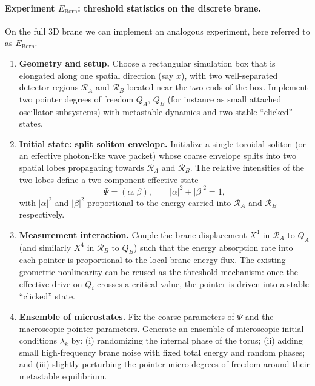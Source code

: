 \paragraph{Experiment $E_{\mathrm{Born}}$: threshold statistics on the discrete brane.}

On the full 3D brane we can implement an analogous experiment, here referred to as $E_{\mathrm{Born}}$.

\begin{enumerate}
  \item \textbf{Geometry and setup.}
    Choose a rectangular simulation box that is elongated along one spatial direction (say $x$), with two well-separated detector regions $\mathcal{R}_A$ and $\mathcal{R}_B$ located near the two ends of the box.
    Implement two pointer degrees of freedom $Q_A$, $Q_B$ (for instance as small attached oscillator subsystems) with metastable dynamics and two stable ``clicked'' states.
  \item \textbf{Initial state: split soliton envelope.}
    Initialize a single toroidal soliton (or an effective photon-like wave packet) whose coarse envelope splits into two spatial lobes propagating towards $\mathcal{R}_A$ and $\mathcal{R}_B$.
    The relative intensities of the two lobes define a two-component effective state
    \begin{equation}
      \Psi = (\alpha,\beta),
      \qquad
      |\alpha|^2 + |\beta|^2 = 1,
    \end{equation}
    with $|\alpha|^2$ and $|\beta|^2$ proportional to the energy carried into $\mathcal{R}_A$ and $\mathcal{R}_B$ respectively.
  \item \textbf{Measurement interaction.}
    Couple the brane displacement $X^4$ in $\mathcal{R}_A$ to $Q_A$ (and similarly $X^4$ in $\mathcal{R}_B$ to $Q_B$) such that the energy absorption rate into each pointer is proportional to the local brane energy flux.
    The existing geometric nonlinearity can be reused as the threshold mechanism:
    once the effective drive on $Q_i$ crosses a critical value, the pointer is driven into a stable ``clicked'' state.
  \item \textbf{Ensemble of microstates.}
    Fix the coarse parameters of $\Psi$ and the macroscopic pointer parameters.
    Generate an ensemble of microscopic initial conditions $\lambda_k$ by:
    (i) randomizing the internal phase of the torus;
    (ii) adding small high-frequency brane noise with fixed total energy and random phases; and
    (iii) slightly perturbing the pointer micro-degrees of freedom around their metastable equilibrium.

\end{enumerate}

